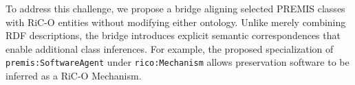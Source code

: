 \documentclass[runningheads]{llncs}
\begin{document}
%
 To address this challenge, we propose a bridge aligning selected PREMIS classes with RiC-O entities without modifying either ontology. Unlike merely combining RDF descriptions, the bridge introduces explicit semantic correspondences that enable additional class inferences. For example, the proposed specialization of \texttt{premis:SoftwareAgent} under \texttt{rico:Mechanism} allows preservation software to be inferred as a RiC-O Mechanism.
 
\end{document}
